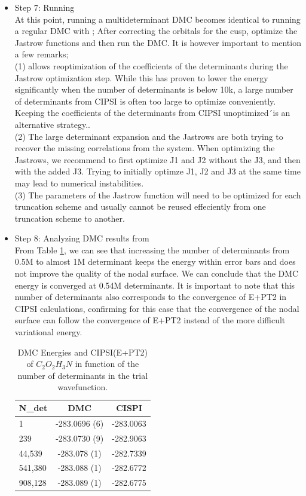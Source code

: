 \begin{itemize}
\item Step 7: Running \qmcpack \\
At this point, running a multideterminant DMC becomes identical to running a regular DMC with \qmcpack; 
After correcting the orbitals for the cusp, optimize the Jastrow functions and then run the DMC. 
It is however important to mention a few remarks;\\

(1) \qmcpack allows reoptimization of the coefficients of the
determinants during the Jastrow optimization step. While this has
proven to lower the energy significantly when the number of
determinants is below 10k, a large number of determinants from CIPSI
is often too large to optimize conveniently. Keeping the coefficients
of the determinants from CIPSI unoptimized´is an alternative strategy..\\

(2) The large determinant expansion and the Jastrows are both trying
to recover the missing correlations from the system. When optimizing
the Jastrows, we recommend to first optimize J1 and J2 without the J3,
and then with the added J3. Trying to initially optimze J1, J2 and J3
at the same time may lead to numerical instabilities.\\

(3) The parameters of the Jastrow function will need to be optimized
for each truncation scheme and usually cannot be reused effeciently
from one truncation scheme to another.

\item Step 8: Analyzing DMC results from \qmcpack \\

From Table \ref{TAB:CIPSI-DMC}, we can see that increasing the number
of determinants from 0.5M to almost 1M determinant keeps the energy
within error bars and does not improve the quality of the nodal
surface. We can conclude that the DMC energy is converged at 0.54M
determinants. It is important to note that this number of determinants
also corresponds to the convergence of E+PT2 in CIPSI calculations,
confirming for this case that the convergence of the nodal surface can
follow the convergence of E+PT2 instead of the more difficult
variational energy.


\begin{table}[t]
\centering
\caption{DMC Energies and CIPSI(E+PT2) of $C_2O_2H_3N$ in function of the number of determinants in the trial wavefunction.}
\label{TAB:CIPSI-DMC}
\begin{tabular}{l|c|c}
\hline 
N\_det & DMC& CISPI\\
\hline
1 & -283.0696 (6)&-283.0063\\
239 & -283.0730 (9)&-282.9063\\
44,539 & -283.078 (1)&-282.7339\\
541,380 & -283.088 (1)&-282.6772\\
908,128& -283.089  (1)&-282.6775\end{tabular}
\end{table}

\end{itemize}


